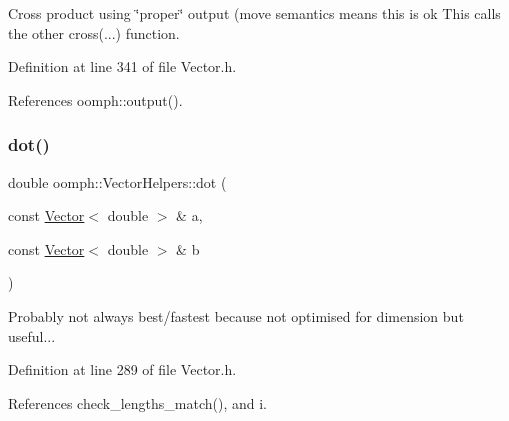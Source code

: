 Cross product using \char`\"{}proper\char`\"{} output (move semantics means this is ok This calls the other cross(...) function. 



Definition at line 341 of file Vector.\+h.



References oomph\+::output().

\mbox{\label{namespaceoomph_1_1VectorHelpers_a3df72a05fe435265c5b42dc232ff351c}} 
\subsubsection{\texorpdfstring{dot()}{dot()}}
{\footnotesize\ttfamily double oomph\+::\+Vector\+Helpers\+::dot (\begin{DoxyParamCaption}\item[{const \hyperlink{classoomph_1_1Vector}{Vector}$<$ double $>$ \&}]{a,  }\item[{const \hyperlink{classoomph_1_1Vector}{Vector}$<$ double $>$ \&}]{b }\end{DoxyParamCaption})\hspace{0.3cm}{\ttfamily [inline]}}



Probably not always best/fastest because not optimised for dimension but useful... 



Definition at line 289 of file Vector.\+h.



References check\+\_\+lengths\+\_\+match(), and i.



